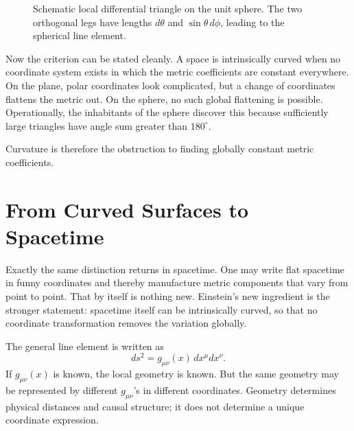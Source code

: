 \begin{figure}[t]
\centering
{}
\caption{Schematic local differential triangle on the unit sphere. The two orthogonal legs have lengths \(d\theta\) and \(\sin\theta\,d\phi\), leading to the spherical line element.}
\end{figure}

Now the criterion can be stated cleanly. A space is intrinsically curved when no coordinate system exists in which the metric coefficients are constant everywhere. On the plane, polar coordinates look complicated, but a change of coordinates flattens the metric out. On the sphere, no such global flattening is possible. Operationally, the inhabitants of the sphere discover this because sufficiently large triangles have angle sum greater than \(180^\circ\).

Curvature is therefore the obstruction to finding globally constant metric coefficients.

\section{From Curved Surfaces to Spacetime}

Exactly the same distinction returns in spacetime. One may write flat spacetime in funny coordinates and thereby manufacture metric components that vary from point to point. That by itself is nothing new. Einstein's new ingredient is the stronger statement: spacetime itself can be intrinsically curved, so that no coordinate transformation removes the variation globally.

The general line element is written as
\begin{equation}
ds^2 = g_{\mu\nu}(x)\,dx^\mu dx^\nu.
\end{equation}
If \(g_{\mu\nu}(x)\) is known, the local geometry is known. But the same geometry may be represented by different \(g_{\mu\nu}\)'s in different coordinates. Geometry determines physical distances and causal structure; it does not determine a unique coordinate expression.

